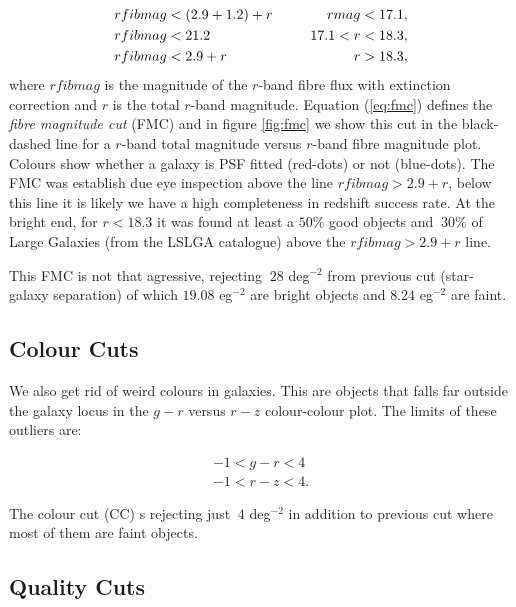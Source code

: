 \documentclass[fleqn,usenatbib]{mnras}
\begin{document}
\begin{eqnarray}\label{eq:fmc}
    &rfibmag < (2.9 + 1.2) + r  \hspace{3 mm} \hspace{3 mm} &rmag < 17.1, \nonumber \\
    &rfibmag < 21.2 \hspace{3 mm} \hspace{3 mm} &17.1 < r < 18.3, \nonumber \\ 
    &rfibmag < 2.9 + r \hspace{3 mm} \hspace{3 mm} &r > 18.3,
\end{eqnarray}
where $rfibmag$ is the magnitude of the $r$-band fibre flux with extinction correction and $r$ is the total $r$-band magnitude. Equation (\ref{eq:fmc}) defines the {\it fibre magnitude cut} (FMC) and in figure \ref{fig:fmc} we show this cut in the black-dashed line for a $r$-band total magnitude versus $r$-band fibre magnitude plot. Colours show whether a galaxy is PSF fitted (red-dots) or not (blue-dots). The FMC was establish due eye inspection above the line $rfibmag > 2.9 + r$, below this line it is likely we have a high completeness in redshift success rate. At the bright end, for $r < 18.3$ it was found at least a $50 \%$ good objects and $~30 \%$ of Large Galaxies (from the LSLGA catalogue) above the $rfibmag > 2.9 + r$ line. 

This FMC is not that agressive, rejecting $~28$ deg$^{-2}$ from previous cut (star-galaxy separation) of which $19.08$ eg$^{-2}$ are bright objects and $8.24$ eg$^{-2}$ are faint.

\subsection{Colour Cuts}

We also get rid of weird colours in galaxies. This are objects that falls far outside the galaxy locus in the $g-r$ versus $r-z$ colour-colour plot. The limits of these outliers are:

\begin{eqnarray}
    -1 < g-r < 4 \nonumber \\
    -1 < r-z < 4.
\end{eqnarray}

The colour cut (CC) s rejecting just $~4$ deg$^{-2}$ in addition to previous cut where most of them are faint objects.

\subsection{Quality Cuts}
\end{document}
